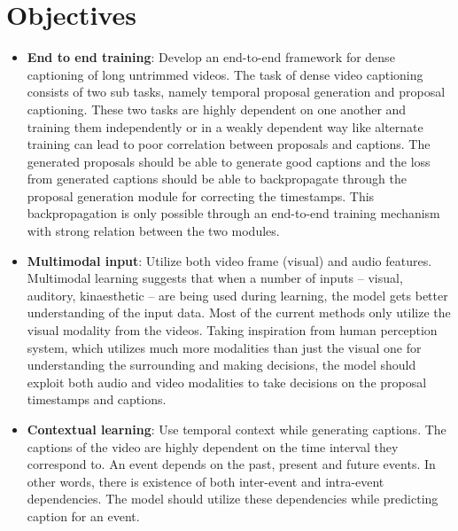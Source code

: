 \section{Objectives}

\par %

\begin{itemize}
	\item \textbf{End to end training}: Develop an end-to-end framework for dense captioning of long untrimmed videos. The task of dense video captioning consists of two sub tasks, namely temporal proposal generation and proposal captioning. These two tasks are highly dependent on one another and training them independently or in a weakly dependent way like alternate training can lead to poor correlation between proposals and captions. The generated proposals should be able to generate good captions and the loss from generated captions should be able to backpropagate through the proposal generation module for correcting the timestamps. This backpropagation is only possible through an end-to-end training mechanism with strong relation between the two modules.
	\item \textbf{Multimodal input}: Utilize both video frame (visual) and audio features. Multimodal learning suggests that when a number of inputs – visual, auditory, kinaesthetic – are being used during learning, the model gets better understanding of the input data. Most of the current methods only utilize the visual modality from the videos. Taking inspiration from human perception system, which utilizes much more modalities than just the visual one for understanding the surrounding and making decisions, the model should exploit both audio and video modalities to take decisions on the proposal timestamps and captions.
	\item \textbf{Contextual learning}: Use temporal context while generating captions. The captions of the video are highly dependent on the time interval they correspond to. An event depends on the past, present and future events. In other words, there is existence of both inter-event and intra-event dependencies. The model should utilize these dependencies while predicting caption for an event.
\end{itemize}
